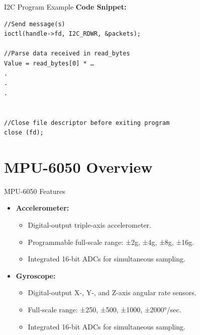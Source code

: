 \begin{frame}[fragile]{I2C Program Example}
    \textbf{Code Snippet:}
    \begin{verbatim}
//Send message(s)
ioctl(handle->fd, I2C_RDWR, &packets);

//Parse data received in read_bytes
Value = read_bytes[0] * …
.
.
.


//Close file descriptor before exiting program
close (fd);

    \end{verbatim}

\end{frame}


\section{MPU-6050 Overview}
\begin{frame}{MPU-6050 Features}
    \begin{itemize}
        \item \textbf{Accelerometer:}
        \begin{itemize}
            \item Digital-output triple-axis accelerometer.
            \item Programmable full-scale range: ±2g, ±4g, ±8g, ±16g.
            \item Integrated 16-bit ADCs for simultaneous sampling.
        \end{itemize}
        \item \textbf{Gyroscope:}
        \begin{itemize}
            \item Digital-output X-, Y-, and Z-axis angular rate sensors.
            \item Full-scale range: ±250, ±500, ±1000, ±2000°/sec.
            \item Integrated 16-bit ADCs for simultaneous sampling.
        \end{itemize}
    \end{itemize}
\end{frame}

